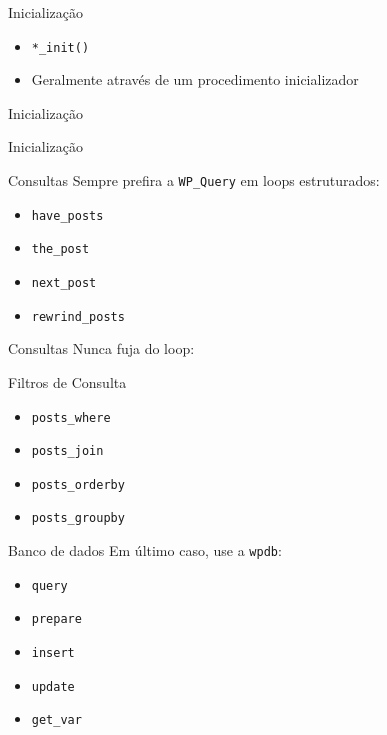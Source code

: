 \documentclass{beamer}
\begin{document}
\begin{frame}{Inicialização}
\begin{itemize}
  \pause \item \texttt{*\_init()}
  \pause \item Geralmente através de um procedimento inicializador
\end{itemize}
\end{frame}

\begin{frame}{Inicialização}
  
  \pause 
\end{frame}

\begin{frame}{Inicialização}
  
  \pause 
\end{frame}

\begin{frame}{Consultas}
Sempre prefira a \texttt{WP\_Query} em loops estruturados:
\begin{itemize}
  \pause \item \texttt{have\_posts}
  \pause \item \texttt{the\_post}
  \pause \item \texttt{next\_post}
  \pause \item \texttt{rewrind\_posts}
\end{itemize}
\end{frame}

\begin{frame}{Consultas}
  Nunca fuja do loop:
  \pause 
\end{frame}

\begin{frame}{Filtros de Consulta}
\begin{itemize}
  \pause \item \texttt{posts\_where}
  \pause \item \texttt{posts\_join}
  \pause \item \texttt{posts\_orderby}
  \pause \item \texttt{posts\_groupby}
\end{itemize}
\end{frame}

\begin{frame}{Banco de dados}
Em último caso, use a \texttt{wpdb}:
\begin{itemize}
  \pause \item \texttt{query}
  \pause \item \texttt{prepare}
  \pause \item \texttt{insert}
  \pause \item \texttt{update}
  \pause \item \texttt{get\_var}
\end{itemize}
\end{frame}
\end{document}
